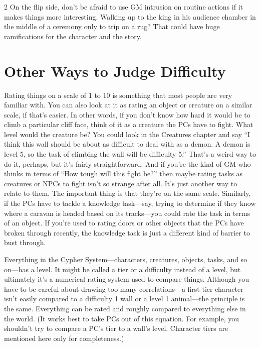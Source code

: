 \begin{multicols}{2}
On the flip side, don’t be afraid to use GM intrusion on routine actions if it makes things more interesting. Walking up to the king in his audience chamber in the middle of a ceremony only to trip on a rug? That could have huge ramifications for the character and the story.

\section{Other Ways to Judge Difficulty}

Rating things on a scale of 1 to 10 is something that most people are very familiar with. You can also look at it as rating an object or creature on a similar scale, if that’s easier. In other words, if you don’t know how hard it would be to climb a particular cliff face, think of it as a creature the PCs have to fight. What level would the creature be? You could look in the Creatures chapter and say “I think this wall should be about as difficult to deal with as a demon. A demon is level 5, so the task of climbing the wall will be difficulty 5.” That’s a weird way to do it, perhaps, but it’s fairly straightforward. And if you’re the kind of GM who thinks in terms of “How tough will this fight be?” then maybe rating tasks as creatures or NPCs to fight isn’t so strange after all. It’s just another way to relate to them. The important thing is that they’re on the same scale. Similarly, if the PCs have to tackle a knowledge task—say, trying to determine if they know where a caravan is headed based on its tracks—you could rate the task in terms of an object. If you’re used to rating doors or other objects that the PCs have broken through recently, the knowledge task is just a different kind of barrier to bust through.

Everything in the Cypher System—characters, creatures, objects, tasks, and so on—has a level. It might be called a tier or a difficulty instead of a level, but ultimately it’s a numerical rating system used to compare things. Although you have to be careful about drawing too many correlations—a first-tier character isn’t easily compared to a difficulty 1 wall or a level 1 animal—the principle is the same. Everything can be rated and roughly compared to everything else in the world. (It works best to take PCs out of this equation. For example, you shouldn’t try to compare a PC’s tier to a wall’s level. Character tiers are mentioned here only for completeness.)


\end{multicols}
